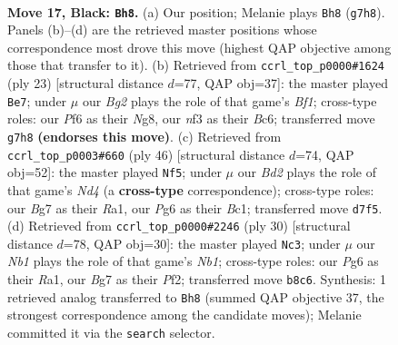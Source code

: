 \documentclass[11pt]{article}
\begin{document}
\clearpage

\begin{figure}[p]\centering
\begin{subfigure}{0.46\textwidth}\centering
\resizebox{\linewidth}{!}{%
\newchessgame
\chessboard[
  setfen={rn3r2/pppb1kb1/5pp1/4p2p/2P1P3/2N1BN2/PPB2PP1/1R2K1R1 b - - 5 17},
  showmover=false,
  pgfstyle=straightmove, color=movearrow, markmove={g7-h8}
]}
\caption{}
\end{subfigure}\hfill
\begin{subfigure}{0.46\textwidth}\centering
\resizebox{\linewidth}{!}{%
\newchessgame
\chessboard[
  setfen={r3kbnr/5ppp/p1b1p3/1p6/4P3/1BN1B3/PP3PPP/R2R2K1 b kq - 1 12},
  showmover=false,
  pgfstyle=straightmove, color=movearrow, markmove={f8-e7}
]}
\caption{}
\end{subfigure}
\\[4pt]
\begin{subfigure}{0.46\textwidth}\centering
\resizebox{\linewidth}{!}{%
\newchessgame
\chessboard[
  setfen={1r2r1k1/1pp2ppp/pn1b1n2/3P4/3N4/1P4P1/P4PBP/R1BR2K1 w - - 1 24},
  showmover=false,
  pgfstyle=straightmove, color=movearrow, markmove={d4-f5}
]}
\caption{}
\end{subfigure}\hfill
\begin{subfigure}{0.46\textwidth}\centering
\resizebox{\linewidth}{!}{%
\newchessgame
\chessboard[
  setfen={r4rk1/pp2bpp1/4bn1p/3p4/3P4/6PP/PP3PB1/RNB2RK1 w - - 1 16},
  showmover=false,
  pgfstyle=straightmove, color=movearrow, markmove={b1-c3}
]}
\caption{}
\end{subfigure}
\caption{\textbf{Move 17, Black: \texttt{Bh8}.} (a) Our position; Melanie plays \texttt{Bh8} (\texttt{g7h8}). Panels (b)--(d) are the retrieved master positions whose correspondence most drove this move (highest QAP objective among those that transfer to it). (b) Retrieved from \texttt{ccrl\_top\_p0000\#1624} (ply 23) [structural distance $d$=77, QAP obj=37]: the master played \texttt{Be7}; under $\mu$ our \emph{Bg2} plays the role of that game's \emph{Bf1}; cross-type roles: our \emph{P}f6 as their \emph{N}g8, our \emph{n}f3 as their \emph{B}c6; transferred move \texttt{g7h8} \textbf{(endorses this move)}. (c) Retrieved from \texttt{ccrl\_top\_p0003\#660} (ply 46) [structural distance $d$=74, QAP obj=52]: the master played \texttt{Nf5}; under $\mu$ our \emph{Bd2} plays the role of that game's \emph{Nd4} (a \textbf{cross-type} correspondence); cross-type roles: our \emph{B}g7 as their \emph{R}a1, our \emph{P}g6 as their \emph{B}c1; transferred move \texttt{d7f5}. (d) Retrieved from \texttt{ccrl\_top\_p0000\#2246} (ply 30) [structural distance $d$=78, QAP obj=30]: the master played \texttt{Nc3}; under $\mu$ our \emph{Nb1} plays the role of that game's \emph{Nb1}; cross-type roles: our \emph{P}g6 as their \emph{R}a1, our \emph{B}g7 as their \emph{P}f2; transferred move \texttt{b8c6}. Synthesis: 1 retrieved analog transferred to \texttt{Bh8} (summed QAP objective 37, the strongest correspondence among the candidate moves); Melanie committed it via the \texttt{search} selector.}
\label{fig:thought-m33}
\end{figure}
\end{document}
